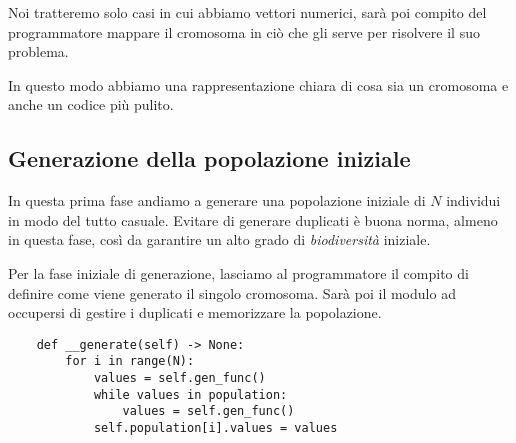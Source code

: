 Noi tratteremo solo casi in cui abbiamo vettori numerici, sarà poi compito del
programmatore mappare il cromosoma in ciò che gli serve per risolvere il suo
problema.

In questo modo abbiamo una rappresentazione chiara di cosa sia un cromosoma e
anche un codice più pulito.

\subsection{Generazione della popolazione iniziale}

In questa prima fase andiamo a generare una popolazione iniziale di $N$
individui in modo del tutto casuale. Evitare di generare duplicati è buona
norma, almeno in questa fase, così da garantire un alto grado di
\emph{biodiversità} iniziale.

Per la fase iniziale di generazione, lasciamo al programmatore il compito di
definire come viene generato il singolo cromosoma. Sarà poi il modulo ad
occupersi di gestire i duplicati e memorizzare la popolazione.

\begin{verbatim}
	def __generate(self) -> None:
		for i in range(N):
			values = self.gen_func()
			while values in population:
				values = self.gen_func()
			self.population[i].values = values
\end{verbatim}


